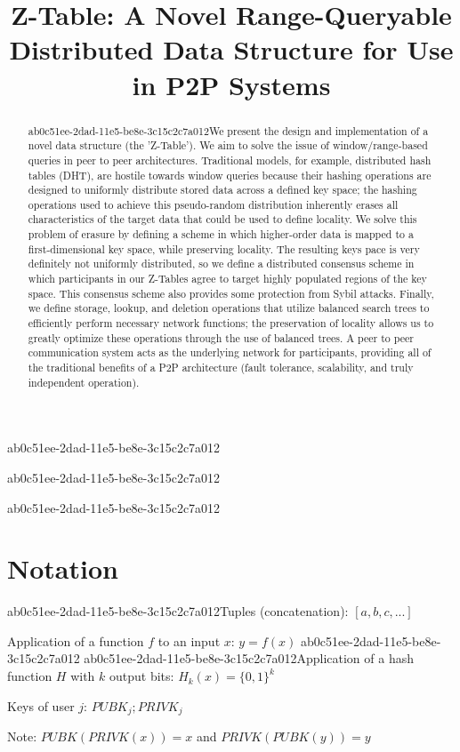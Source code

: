 \documentclass[12pt]{article}
\title{Z-Table: A Novel Range-Queryable Distributed Data Structure for Use in P2P Systems}
\begin{document}
ab0c51ee-2dad-11e5-be8e-3c15c2c7a012
\maketitle
ab0c51ee-2dad-11e5-be8e-3c15c2c7a012
\begin{abstract}
ab0c51ee-2dad-11e5-be8e-3c15c2c7a012We present the design and implementation of a novel data structure (the 'Z-Table'). We aim to solve the issue of window/range-based queries in peer to peer architectures. Traditional models, for example,  distributed hash tables (DHT), are hostile towards window queries because their hashing operations are designed to uniformly distribute stored data across a defined key space; the hashing operations used to achieve this pseudo-random distribution inherently erases all characteristics of the target data that could be used to define locality. We solve this problem of erasure by defining a scheme in which higher-order data is mapped to a first-dimensional key space, while preserving locality. The resulting keys pace is very definitely not uniformly distributed, so we define a distributed consensus scheme in which participants in our Z-Tables agree to target highly populated regions of the key space. This consensus scheme also provides some protection from Sybil attacks. Finally, we define storage, lookup, and deletion operations that utilize balanced search trees to efficiently perform necessary network functions; the preservation of locality allows us to greatly optimize these operations through the use of balanced trees. A peer to peer communication system acts as the underlying network for participants, providing all of the traditional benefits of a P2P architecture (fault tolerance, scalability, and truly independent operation).
\end{abstract}
ab0c51ee-2dad-11e5-be8e-3c15c2c7a012
\section{Notation}

ab0c51ee-2dad-11e5-be8e-3c15c2c7a012Tuples (concatenation): $[a,b,c,...]$

Application of a function $f$ to an input $x$: $y=f(x)$
ab0c51ee-2dad-11e5-be8e-3c15c2c7a012
ab0c51ee-2dad-11e5-be8e-3c15c2c7a012Application of a hash function $H$ with $k$ output bits: $H_{k}(x) = \{0,1\}^k$

Keys of user $j$: $ PUBK_j; PRIVK_j $

Note: $PUBK(PRIVK(x)) = x$ and $PRIVK(PUBK(y)) = y$~
\end{document}

